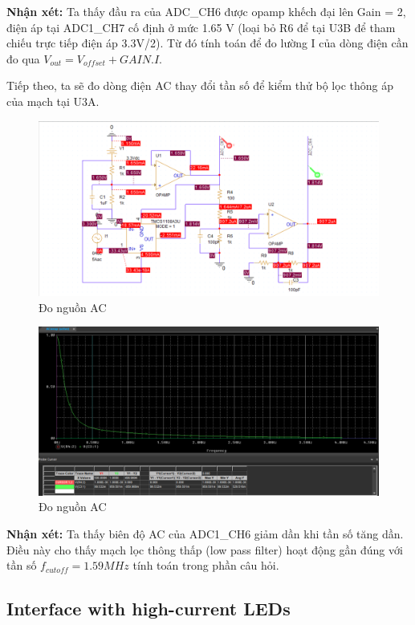 \textbf{Nhận xét:} Ta thấy đầu ra của ADC\_CH6 được opamp khếch đại lên Gain = 2, điện áp tại ADC1\_CH7 cố định ở mức 1.65 V (loại bỏ R6 để tại U3B để tham chiếu trực tiếp điện áp 3.3V/2). Từ đó tính toán để đo lường I của dòng điện cần đo qua $V_{out} = V_{offset} + GAIN.I$.

Tiếp theo, ta sẽ đo dòng điện AC thay đổi tần số để kiểm thử bộ lọc thông áp của mạch tại U3A.

\begin{figure}[ht]
    \centering
    \includegraphics[width=1\textwidth]{graphics/section4/f23.png}
    \caption{Đo nguồn AC}
\end{figure}

\begin{figure}[ht]
    \centering
    \includegraphics[width=1\textwidth]{graphics/section4/f24.png}
    \caption{Đo nguồn AC}
\end{figure}
\pagebreak

\textbf{Nhận xét:} Ta thấy biên độ AC của ADC1\_CH6 giảm dần khi tần số tăng dần. Điều này cho thấy mạch lọc thông thấp (low pass filter) hoạt động gần đúng với tần số $f_{cutoff} = 1.59 MHz$ tính toán trong phần câu hỏi.


\subsection{Interface with high-current LEDs}


